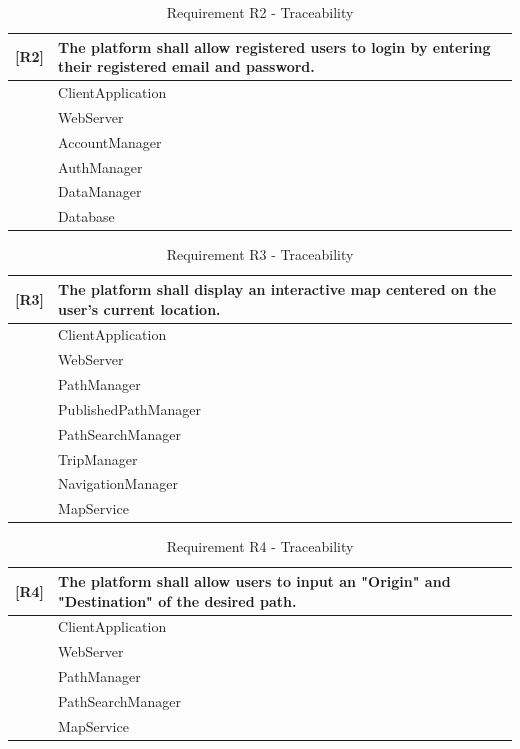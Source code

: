 \begin{table}[H]
    \centering
    \begin{tabular}{|p{1cm}|p{14cm}|}
    \hline
    \textbf{[R2]} & \textbf{The platform shall allow registered users to login by entering their registered email and password.} \\ \hline
    [C1] & ClientApplication \\ \hline
    [C2] & WebServer \\ \hline
    [C3] & AccountManager \\ \hline
    [C5] & AuthManager \\ \hline
    [C15] & DataManager\\ \hline
    [C16] & Database\\ \hline
    \end{tabular}
    \caption{Requirement R2 - Traceability}
    \label{tab:RT2}
\end{table}

\begin{table}[H]
    \centering
    \begin{tabular}{|p{1cm}|p{14cm}|}
    \hline
    \textbf{[R3]} & \textbf{The platform shall display an interactive map centered on the user’s current location.} \\ \hline
    [C1] & ClientApplication \\ \hline
    [C2] & WebServer \\ \hline
    [C7] & PathManager \\ \hline
    [C9] & PublishedPathManager \\ \hline
    [C10] & PathSearchManager \\ \hline
    [C11] & TripManager \\ \hline
    [C13] & NavigationManager \\ \hline
    [E2] & MapService \\ \hline
    \end{tabular}
    \caption{Requirement R3 - Traceability}
    \label{tab:RT3}
\end{table}

\begin{table}[H]
    \centering
    \begin{tabular}{|p{1cm}|p{14cm}|}
    \hline
    \textbf{[R4]} & \textbf{The platform shall allow users to input an "Origin" and "Destination" of the desired path.} \\ \hline
    [C1] & ClientApplication \\ \hline
    [C2] & WebServer \\ \hline
    [C7] & PathManager \\ \hline
    [C10] & PathSearchManager \\ \hline
    [E2] & MapService \\ \hline
    \end{tabular}
    \caption{Requirement R4 - Traceability}
    \label{tab:RT4}
\end{table}

